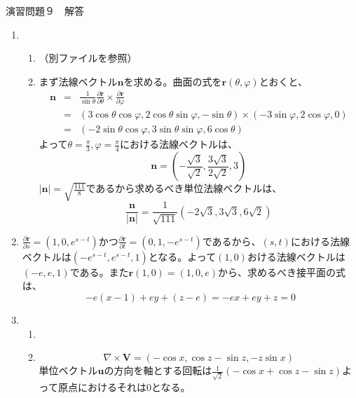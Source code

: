 \documentclass{jarticle}
\begin{document}
\begin{center} {\Large 演習問題９　解答} \end{center}
  \begin{enumerate}
    \item
      \begin{enumerate}
        \item
          （別ファイルを参照）
        \item
          まず法線ベクトル${\bm n}$を求める。曲面の式を${\bm r}(\theta,\varphi)$とおくと、
          \begin{eqnarray*}
          {\bm n} & = & \frac{1}{\sin\theta}\frac{\partial {\bm r}}{\partial \theta} \times \frac{\partial \bm r}{\partial \varphi} \\ 
          & = & (3\cos\theta\cos\varphi,2\cos\theta\sin\varphi,-\sin\theta) \times (-3\sin\varphi,2\cos\varphi,0) \\
          & = & (-2\sin\theta\cos\varphi,3\sin\theta\sin\varphi,6\cos\theta)
          \end{eqnarray*}
          よって$\theta=\frac{\pi}{3},\varphi=\frac{\pi}{4}$における法線ベクトルは、
          \[ \bm n = (-\frac{\sqrt{3}}{\sqrt{2}},\frac{3\sqrt{3}}{2\sqrt{2}},3) \]
          $|\bm n| = \sqrt{\frac{111}{8}}$であるから求めるべき単位法線ベクトルは、
          \[ \frac{\bm n}{|\bm n|} = \frac{1}{\sqrt{111}} (-2\sqrt{3},3\sqrt{3},6\sqrt{2})\]
      \end{enumerate}
    \item
      $\frac{\partial \bm r}{\partial s} = (1,0,e^{s-t})$かつ$\frac{\partial \bm r}{\partial t} = (0,1,-e^{s-t})$であるから、$(s,t)$における法線ベクトルは$(-e^{s-t},e^{s-t},1)$となる。よって$(1,0)$おける法線ベクトルは$(-e,e,1)$である。また${\bm r}(1,0) = (1,0,e)$から、求めるべき接平面の式は、
      \[ -e(x-1)+ey+(z-e)=-ex+ey+z=0 \]
    \item
      \begin{enumerate}
        \item
        \item
          \[\nabla \times {\bm V} = (-\cos x, \cos z - \sin z, -z\sin x)\]
          単位ベクトル$\bm u$の方向を軸とする回転は$\frac{1}{\sqrt 2}( -\cos x+\cos z -\sin z)$よって原点におけるそれは$0$となる。

\end{enumerate}
\end{enumerate}
\end{document}
